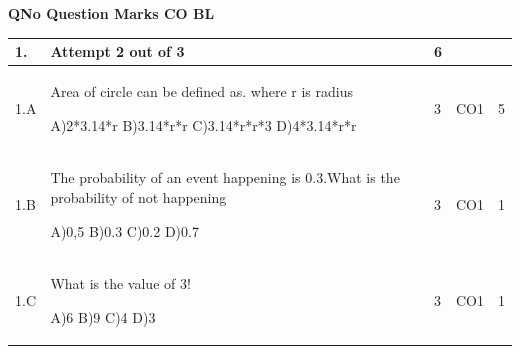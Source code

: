 \documentclass[12pt]{article}
\begin{document}
	\begin{flushleft}
	\bf{QNo}\hspace{1.2cm} \bf{Question} \hspace{5.5cm}  \bf{Marks} \hspace{0.2cm} \bf{CO} \hspace{0.2cm}	\bf{BL}	
	
\end{flushleft} 
	\begin{longtable}{|L{1cm}|L{8cm}|C{1cm}|C{1cm}|C{1cm}|}\hline
		\bf{1}. & \bf{Attempt} \bf2 \bf{out} of \bf3 & \bf6  & & \\ \hline
				1.A & Area of circle can be defined as. where r is radius \newline
					
		A)2*3.14*r\newline
		B)3.14*r*r\newline
		C)3.14*r*r*3\newline
		D)4*3.14*r*r &
		3 &
		CO1&
		5 \\ \hline
		
				1.B & The probability of an event happening is 0.3.What is the probability of not happening \newline
					
		A)0,5\newline
		B)0.3\newline
		C)0.2\newline
		D)0.7 &
		3 &
		CO1&
		1 \\ \hline
		
				1.C & What is the value of 3! \newline
					
		A)6\newline
		B)9\newline
		C)4\newline
		D)3 &
		3 &
		CO1&
		1 \\ \hline
		
		
	\end{longtable}
\end{document}
